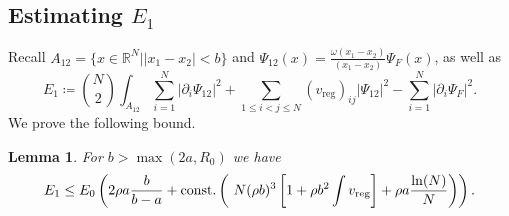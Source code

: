 \documentclass[a4paper,11pt]{article}
\newcommand{\abs}[1]{\left\lvert #1 \right\rvert}
\newcommand{\R}{\mathbb{R}}
\newtheorem{lemma}[theorem]{Lemma}
\numberwithin{equation}{section}
\begin{document}
	\subsection{Estimating $ E_1 $}
	\label{secE1}
		Recall $A_{12}=\{x\in\R^N\vert \abs{x_1-x_2}<b\}$ and $\Psi_{12}(x)=\frac{\omega(x_1-x_2)}{(x_1-x_2)}\Psi_F(x)$, as well as \begin{equation}
		E_1\coloneqq\binom{N}{2}\int_{A_{12}} \sum_{i=1}^{N}\abs{\partial_i\Psi_{12}}^2+\sum_{1\leq i<j\leq N}(v_{\text{reg}})_{ij}\abs{\Psi_{12}}^2-\sum_{i=1}^{N}\abs{\partial_i\Psi_F}^2.
		\end{equation}
		We prove the following bound. \begin{lemma}\label{LemmaE1Bound}
        For $b>\max(2a,R_0)$ we have
			\begin{equation}
			E_1\leq E_0 \left(2\rho a\frac{b}{b-a}+ \textnormal{const.}\left(\ N(\rho b)^3\left[ 1+ \rho b^2\int v_{\textnormal{reg}}\right]+\rho a \frac{\ln(N)}{N}\right)\right).
			\end{equation}
		\end{lemma}
\end{document}
